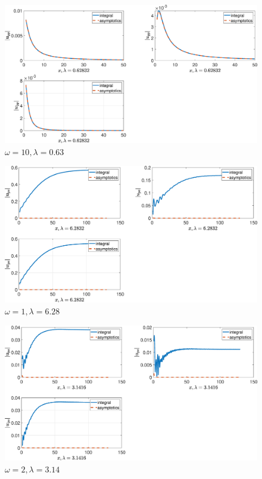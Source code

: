 \begin{figure}[!h]\centering\includegraphics[scale=0.38]{uppw10cp(1)2cp(2)1cs(1)0,5cs(20,3rho(1)2rho(2)1.eps}\caption{$ \omega = 10, \lambda = 0.63$}\end{figure}

\begin{figure}[!h]\centering\includegraphics[scale=0.38]{upsw1cp(1)2cp(2)1cs(1)0,5cs(20,3rho(1)2rho(2)1.eps}\caption{$ \omega = 1, \lambda = 6.28$}\end{figure}

\begin{figure}[!h]\centering\includegraphics[scale=0.38]{upsw2cp(1)2cp(2)1cs(1)0,5cs(20,3rho(1)2rho(2)1.eps}\caption{$ \omega = 2, \lambda = 3.14$}\end{figure}

